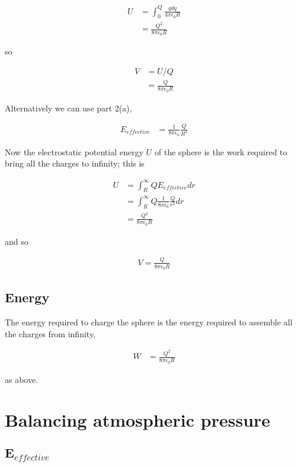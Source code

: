 \documentclass{article}
\newcommand{\mb}{\mathbf}
\begin{document}
\begin{align*}
U &= \int_0^Q \frac{q dq}{4\pi\epsilon_0R} \\
&= \frac{Q^2}{8\pi\epsilon_0R}
\end{align*}

so

\begin{align*}
V &= U / Q \\
&= \frac{Q}{8\pi\epsilon_0R}
\end{align*}

Alternatively we can use part 2(a),

\begin{align*}
E_{effective} &= \frac{1}{8\pi\epsilon_0} \frac{Q}{R^2}
\end{align*}

Now the electrostatic potential energy $U$ of the sphere is the work required to bring all the charges to infinity; this is 

\begin{align*}
U &= \int_R^\infty Q E_{effective} dr \\
&= \int_R^\infty Q \frac{1}{8\pi\epsilon_0}\frac{Q}{r^2} dr \\
&= \frac{Q^2}{8\pi\epsilon_0R}
\end{align*}

and so

\begin{align*}
V = \frac{Q}{8\pi\epsilon_0R}
\end{align*}

\subsection{Energy}

The energy required to charge the sphere is the energy required to assemble all the charges from infinity,

\begin{align*}
W &= \frac{Q^2}{8\pi\epsilon_0R}
\end{align*}

as above.

\section{Balancing atmospheric pressure}

\subsection{$\mb{E}_{effective}$}
\end{document}
